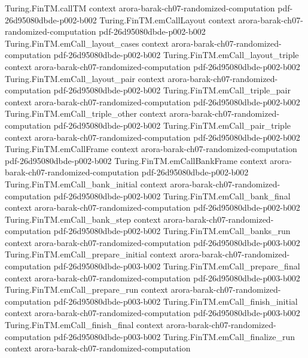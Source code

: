 \begin{theorem}
\proofstep
  {Turing.FinTM.callTM}
  {context}
  {arora-barak-ch07-randomized-computation}
  {pdf-26d95080dbde-p002-b002}
\proofstep
  {Turing.FinTM.emCallLayout}
  {context}
  {arora-barak-ch07-randomized-computation}
  {pdf-26d95080dbde-p002-b002}
\proofstep
  {Turing.FinTM.emCall_layout_cases}
  {context}
  {arora-barak-ch07-randomized-computation}
  {pdf-26d95080dbde-p002-b002}
\proofstep
  {Turing.FinTM.emCall_layout_triple}
  {context}
  {arora-barak-ch07-randomized-computation}
  {pdf-26d95080dbde-p002-b002}
\proofstep
  {Turing.FinTM.emCall_layout_pair}
  {context}
  {arora-barak-ch07-randomized-computation}
  {pdf-26d95080dbde-p002-b002}
\proofstep
  {Turing.FinTM.emCall_triple_pair}
  {context}
  {arora-barak-ch07-randomized-computation}
  {pdf-26d95080dbde-p002-b002}
\proofstep
  {Turing.FinTM.emCall_triple_other}
  {context}
  {arora-barak-ch07-randomized-computation}
  {pdf-26d95080dbde-p002-b002}
\proofstep
  {Turing.FinTM.emCall_pair_triple}
  {context}
  {arora-barak-ch07-randomized-computation}
  {pdf-26d95080dbde-p002-b002}
\proofstep
  {Turing.FinTM.emCallFrame}
  {context}
  {arora-barak-ch07-randomized-computation}
  {pdf-26d95080dbde-p002-b002}
\proofstep
  {Turing.FinTM.emCallBankFrame}
  {context}
  {arora-barak-ch07-randomized-computation}
  {pdf-26d95080dbde-p002-b002}
\proofstep
  {Turing.FinTM.emCall_bank_initial}
  {context}
  {arora-barak-ch07-randomized-computation}
  {pdf-26d95080dbde-p002-b002}
\proofstep
  {Turing.FinTM.emCall_bank_final}
  {context}
  {arora-barak-ch07-randomized-computation}
  {pdf-26d95080dbde-p002-b002}
\proofstep
  {Turing.FinTM.emCall_bank_step}
  {context}
  {arora-barak-ch07-randomized-computation}
  {pdf-26d95080dbde-p002-b002}
\proofstep
  {Turing.FinTM.emCall_banks_run}
  {context}
  {arora-barak-ch07-randomized-computation}
  {pdf-26d95080dbde-p003-b002}
\proofstep
  {Turing.FinTM.emCall_prepare_initial}
  {context}
  {arora-barak-ch07-randomized-computation}
  {pdf-26d95080dbde-p003-b002}
\proofstep
  {Turing.FinTM.emCall_prepare_final}
  {context}
  {arora-barak-ch07-randomized-computation}
  {pdf-26d95080dbde-p003-b002}
\proofstep
  {Turing.FinTM.emCall_prepare_run}
  {context}
  {arora-barak-ch07-randomized-computation}
  {pdf-26d95080dbde-p003-b002}
\proofstep
  {Turing.FinTM.emCall_finish_initial}
  {context}
  {arora-barak-ch07-randomized-computation}
  {pdf-26d95080dbde-p003-b002}
\proofstep
  {Turing.FinTM.emCall_finish_final}
  {context}
  {arora-barak-ch07-randomized-computation}
  {pdf-26d95080dbde-p003-b002}
\proofstep
  {Turing.FinTM.emCall_finalize_run}
  {context}
  {arora-barak-ch07-randomized-computation}

\end{theorem}
